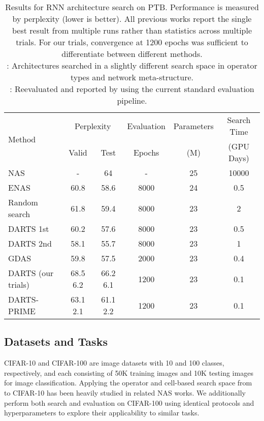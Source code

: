\documentclass[letterpaper]{article} \usepackage{aaai22}  \usepackage{times}  \usepackage{helvet}  \usepackage{courier}  \usepackage[hyphens]{url}  \usepackage{graphicx} \urlstyle{rm} \def\UrlFont{\rm}  \usepackage{natbib}  \usepackage{caption} \DeclareCaptionStyle{ruled}{labelfont=normalfont,labelsep=colon,strut=off} \frenchspacing  \setlength{\pdfpagewidth}{8.5in}  \setlength{\pdfpageheight}{11in}  \usepackage{algorithm}
\begin{document}
\begin{table*}[ht]
\centering \small
\begin{tabular}{lccccc}
\toprule
\multirow{2}{*}{Method}  & \multicolumn{2}{c}{Perplexity} & Evaluation & Parameters  &  Search Time  \\
 &  Valid  &  Test  & Epochs & (M)  &  (GPU Days) \\  \midrule
NAS \cite{zoph2017neural} & - & 64 & - & 25 & 10000\\
ENAS \cite{pham2018efficient} & 60.8 & 58.6 & 8000 & 24 & 0.5 
\\  \midrule
Random search \cite{liu2018darts}  & 61.8 & 59.4 & 8000 & 23 & 2 \\
DARTS 1st \cite{liu2018darts} & 60.2 & 57.6 & 8000 & 23 & 0.5 \\
DARTS 2nd \cite{liu2018darts} & 58.1 & 55.7 & 8000 & 23 & 1 \\ 
GDAS \cite{dong2019searching} & 59.8 & 57.5 & 2000 & 23 & 0.4 \\  \midrule 
DARTS (our trials) & 68.5  6.2 & 66.2  6.1 & 1200 & 23 & 0.1 \\
DARTS-PRIME &63.1  2.1 & 61.1  2.2 & 1200 & 23 & 0.1 \\
\bottomrule
\end{tabular}
\caption{Results for RNN architecture search on PTB. Performance is measured by perplexity (lower is better). All previous works report the single best result from multiple runs rather than statistics across multiple trials. For our trials, convergence at 1200 epochs was sufficient to differentiate between different methods. \\
: Architectures searched in a slightly different search space in operator types and network meta-structure. \\
: Reevaluated and reported by \cite{liu2018darts} using the current standard evaluation pipeline.}
\label{table:rnn}
\end{table*}


\subsection{Datasets and Tasks}

CIFAR-10 and CIFAR-100 \cite{krizhevsky2009cifar} are image datasets with 10 and 100 classes, respectively, and each consisting of 50K training images and 10K testing images for image classification. Applying the operator and cell-based search space from \cite{liu2018darts} to CIFAR-10 has been heavily studied in related NAS works. We additionally perform both search and evaluation on CIFAR-100 using identical protocols and hyperparameters to explore their applicability to similar tasks.
\end{document}
